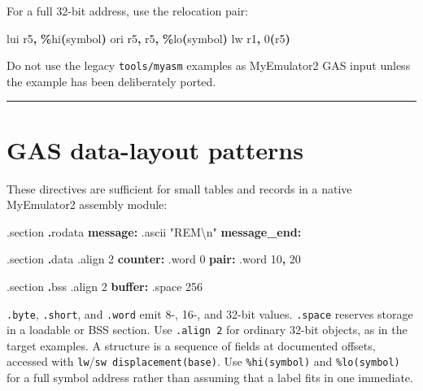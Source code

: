 \documentclass[
  oneside,
  openany]{book}
\newenvironment{Shaded}{\begin{snugshade}}{\end{snugshade}}
\newcommand{\BuiltInTok}[1]{#1}
\newcommand{\DataTypeTok}[1]{\textcolor[rgb]{0.13,0.29,0.53}{#1}}
\newcommand{\DecValTok}[1]{\textcolor[rgb]{0.00,0.00,0.81}{#1}}
\newcommand{\FunctionTok}[1]{\textcolor[rgb]{0.13,0.29,0.53}{\textbf{#1}}}
\newcommand{\NormalTok}[1]{#1}
\newcommand{\OperatorTok}[1]{\textcolor[rgb]{0.81,0.36,0.00}{\textbf{#1}}}
\newcommand{\StringTok}[1]{\textcolor[rgb]{0.31,0.60,0.02}{#1}}
\begin{document}
For a full 32-bit address, use the relocation pair:

\begin{Shaded}
\begin{Highlighting}[]
\NormalTok{lui r5}\OperatorTok{,} \OperatorTok{\%}\NormalTok{hi}\OperatorTok{(}\NormalTok{symbol}\OperatorTok{)}
\NormalTok{ori r5}\OperatorTok{,}\NormalTok{ r5}\OperatorTok{,} \OperatorTok{\%}\NormalTok{lo}\OperatorTok{(}\NormalTok{symbol}\OperatorTok{)}
\NormalTok{lw  r1}\OperatorTok{,} \DecValTok{0}\OperatorTok{(}\NormalTok{r5}\OperatorTok{)}
\end{Highlighting}
\end{Shaded}

Do not use the legacy \texttt{tools/myasm} examples as MyEmulator2 GAS
input unless the example has been deliberately ported.

\begin{center}\rule{0.5\linewidth}{0.5pt}\end{center}

\hypertarget{gas-data-layout-patterns}{%
\section{GAS data-layout patterns}\label{gas-data-layout-patterns}}

These directives are sufficient for small tables and records in a native
MyEmulator2 assembly module:

\begin{Shaded}
\begin{Highlighting}[]
\NormalTok{.}\BuiltInTok{section} \OperatorTok{.}\NormalTok{rodata}
\FunctionTok{message:}\NormalTok{       .ascii }\StringTok{"REM\textbackslash{}n"}
\FunctionTok{message\_end:}

\NormalTok{.}\BuiltInTok{section} \OperatorTok{.}\NormalTok{data}
\NormalTok{.}\BuiltInTok{align} \DecValTok{2}
\FunctionTok{counter:}\NormalTok{       .}\DataTypeTok{word} \DecValTok{0}
\FunctionTok{pair:}\NormalTok{          .}\DataTypeTok{word} \DecValTok{10}\OperatorTok{,} \DecValTok{20}

\NormalTok{.}\BuiltInTok{section} \OperatorTok{.}\NormalTok{bss}
\NormalTok{.}\BuiltInTok{align} \DecValTok{2}
\FunctionTok{buffer:}\NormalTok{        .space }\DecValTok{256}
\end{Highlighting}
\end{Shaded}

\texttt{.byte}, \texttt{.short}, and \texttt{.word} emit 8-, 16-, and
32-bit values. \texttt{.space} reserves storage in a loadable or BSS
section. Use \texttt{.align\ 2} for ordinary 32-bit objects, as in the
target examples. A structure is a sequence of fields at documented
offsets, accessed with \texttt{lw}/\texttt{sw\ displacement(base)}. Use
\texttt{\%hi(symbol)} and \texttt{\%lo(symbol)} for a full symbol
address rather than assuming that a label fits in one immediate.
\end{document}
